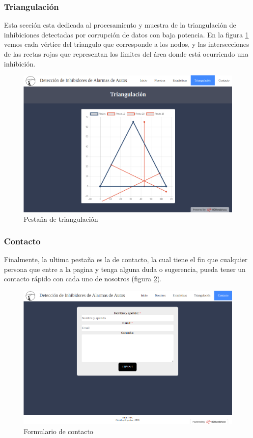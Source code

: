 \subsubsection{Triangulación}
\par Esta sección esta dedicada al procesamiento y muestra de la triangulación de inhibiciones detectadas por corrupción de datos con baja potencia. En la figura \ref{web_triangulacion} vemos cada vértice del triangulo que corresponde a los nodos, y las intersecciones de las rectas rojas que representan los limites del área donde está ocurriendo una inhibición. 
\begin{figure}[h!]
	\centering
	\includegraphics[scale=0.3]{images/web/triangulacion-web.png}
    \caption{Pestaña de triangulación}
	\label{web_triangulacion}
\end{figure}
\subsubsection{Contacto}
Finalmente, la ultima pestaña es la de contacto, la cual tiene el fin que cualquier persona que entre a la pagina y tenga alguna duda o sugerencia, pueda tener un contacto rápido con cada uno de nosotros (figura \ref{web_contacto}).
\begin{figure}[h!]
	\centering
	\includegraphics[scale=0.33]{images/web/contacto-web.png}
    \caption{Formulario de contacto}
	\label{web_contacto}
\end{figure}
